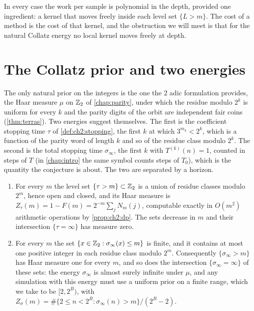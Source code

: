 In every case the work per sample is polynomial in the depth, provided one
ingredient: a kernel that moves freely inside each level set $\{L>m\}$. The
cost of a method is the cost of that kernel, and the obstruction we will meet
is that for the natural Collatz energy no local kernel moves freely at depth.

\section{The Collatz prior and two energies}

The only natural prior on the integers is the one the $2$ adic formulation
provides, the Haar measure $\mu$ on $\mathbb{Z}_2$ of \cref{chap:parity}, under which
the residue modulo $2^k$ is uniform for every $k$ and the parity digits of the
orbit are independent fair coins (\cref{thm:terras}). Two energies suggest
themselves. The first is the coefficient stopping time $\tau$ of \cref{def:ch2:stopping}, the
first $k$ at which $3^{m_k}<2^k$, which is a function of the parity word of
length $k$ and so of the residue class modulo $2^k$. The second is the total
stopping time $\sigma_\infty$, the first $k$ with $T^{(k)}(n)=1$, counted in steps of $T$ (in \cref{chap:intro} the same symbol counts steps of $T_0$), which is the
quantity the conjecture is about. The two are separated by a horizon.

\begin{proposition}\label{prop:ch10b:horizons}
\leavevmode
\begin{enumerate}[label=(\roman*),leftmargin=2em]
\item For every $m$ the level set $\{\tau>m\}\subset\mathbb{Z}_2$ is a union of
  residue classes modulo $2^m$, hence open and closed, and its Haar measure is
  $Z_\tau(m)=1-F(m)=2^{-m}\sum_jN_m(j)$, computable exactly in $O(m^2)$
  arithmetic operations by \cref{prop:ch2:dp}. The sets decrease in $m$ and
  their intersection $\{\tau=\infty\}$ has measure zero.
\item For every $m$ the set $\{x\in\mathbb{Z}_2:\sigma_\infty(x)\le m\}$ is finite, and it contains at most one positive integer in each residue class modulo $2^m$.
  Consequently $\{\sigma_\infty>m\}$ has Haar measure one for every $m$, and so does the intersection $\{\sigma_\infty=\infty\}$ of these sets: the energy $\sigma_\infty$ is almost surely infinite under $\mu$, and any simulation with this energy must use a uniform prior on a finite range, which we take to be $[2,2^B)$, with $Z_\sigma(m)=\#\{2\le n<2^B:\sigma_\infty(n)>m\}/(2^B-2)$.
\end{enumerate}
\end{proposition}

